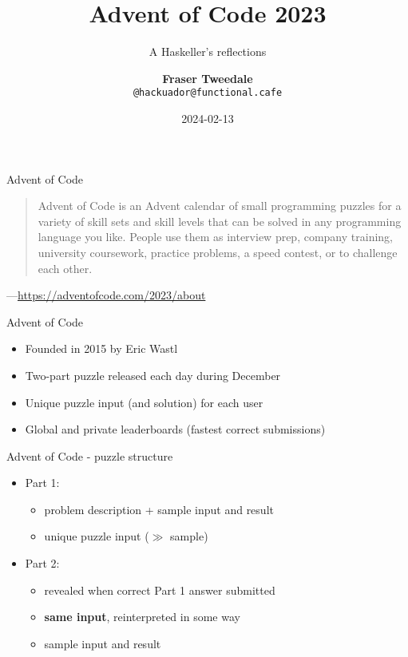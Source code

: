 \documentclass[ignorenonframetext,aspectratio=169,12pt]{beamer}
\title{\bf Advent of Code 2023}
\subtitle{A Haskeller's reflections}
\author{{\bf Fraser Tweedale}\\
    \texttt{@hackuador@functional.cafe}}
\date{2024-02-13}
\begin{document}
\frame{\titlepage}

\begin{frame}{Advent of Code}

    \large
    \bigskip
    \bigskip

    \begin{quote}
    Advent of Code is an Advent calendar of small programming
    puzzles for a variety of skill sets and skill levels that can be
    solved in any programming language you like. People use them as
    interview prep, company training, university coursework,
    practice problems, a speed contest, or to challenge each other.
    \end{quote}

    \begin{flushright}
    ---\url{https://adventofcode.com/2023/about}
    \end{flushright}

\end{frame}

\begin{frame}{Advent of Code}

    \begin{itemize}
        \item Founded in 2015 by Eric Wastl
        \item Two-part puzzle released each day during December
        \item Unique puzzle input (and solution) for each user
        \item Global and private leaderboards (fastest correct submissions)
    \end{itemize}

\end{frame}

\begin{frame}{Advent of Code - puzzle structure}

    \begin{itemize}
        \item Part 1:
            \begin{itemize}
                \item problem description + sample input and result
                \item unique puzzle input ($\gg$ sample)
            \end{itemize}
        \item Part 2: 
            \begin{itemize}
                \item revealed when correct Part 1 answer submitted
                \item {\bf same input}, reinterpreted in some way
                \item sample input and result
            \end{itemize}
    \end{itemize}

\end{frame}
\end{document}
